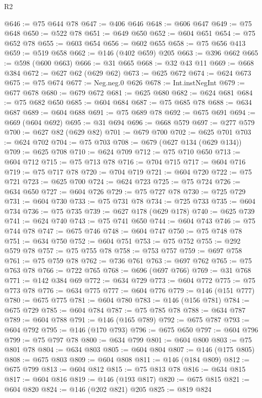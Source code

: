 \begin{lexlean}{R2}
\begin{coremodule}
@646 := @75 @644 @78
@647 := @406 @646
@648 := @606 @647
@649 := @75 @648
@650 := @522 @78
@651 := @649 @650
@652 := @604 @651
@654 := @75 @652 @78
@655 := @603 @654
@656 := @602 @655
@658 := @75 @656 @413
@659 := @519 @658
@662 := @146 (@402 @659) @205
@663 := @396 @662
@665 := @598 (@600 @663)
@666 := @31 @665
@668 := @32 @43 @11
@669 := @668 @384
@672 := @627 @62 (@629 @62)
@673 := @625 @672
@674 := @624 @673
@675 := @75 @674
@677 := Neg.neg.{0} @626
@678 := Int.instNegInt
@679 := @677 @678
@680 := @679 @672
@681 := @625 @680
@682 := @624 @681
@684 := @75 @682 @650
@685 := @604 @684
@687 := @75 @685 @78
@688 := @634 @687
@689 := @604 @688
@691 := @75 @689 @78
@692 := @675 @691
@694 := @669 (@604 @692)
@695 := @31 @694
@696 := @668 @579
@697 := @277 @579
@700 := @627 @82 (@629 @82)
@701 := @679 @700
@702 := @625 @701
@703 := @624 @702
@704 := @75 @703
@708 := @679 (@627 @134 (@629 @134))
@709 := @625 @708
@710 := @624 @709
@712 := @75 @710 @650
@713 := @604 @712
@715 := @75 @713 @78
@716 := @704 @715
@717 := @604 @716
@719 := @75 @717 @78
@720 := @704 @719
@721 := @604 @720
@722 := @75 @721
@723 := @625 @700
@724 := @624 @723
@725 := @75 @724
@726 := @634 @650
@727 := @604 @726
@729 := @75 @727 @78
@730 := @725 @729
@731 := @604 @730
@733 := @75 @731 @78
@734 := @725 @733
@735 := @604 @734
@736 := @75 @735
@739 := @627 @178 (@629 @178)
@740 := @625 @739
@741 := @624 @740
@743 := @75 @741 @650
@744 := @604 @743
@746 := @75 @744 @78
@747 := @675 @746
@748 := @604 @747
@750 := @75 @748 @78
@751 := @634 @750
@752 := @604 @751
@753 := @75 @752
@755 := @292 @579 @78
@757 := @75 @755 @78
@758 := @753 @757
@759 := @697 @758
@761 := @75 @759 @78
@762 := @736 @761
@763 := @697 @762
@765 := @75 @763 @78
@766 := @722 @765
@768 := @696 (@697 @766)
@769 := @31 @768
@771 := @142 @384 @69
@772 := @634 @729
@773 := @604 @772
@775 := @75 @773 @78
@776 := @634 @775
@777 := @604 @776
@779 := @146 (@151 @777)
@780 := @675 @775
@781 := @604 @780
@783 := @146 (@156 @781)
@784 := @675 @729
@785 := @604 @784
@787 := @75 @785 @78
@788 := @634 @787
@789 := @604 @788
@791 := @146 (@165 @789)
@792 := @675 @787
@793 := @604 @792
@795 := @146 (@170 @793)
@796 := @675 @650
@797 := @604 @796
@799 := @75 @797 @78
@800 := @634 @799
@801 := @604 @800
@803 := @75 @801 @78
@804 := @634 @803
@805 := @604 @804
@807 := @146 (@175 @805)
@808 := @675 @803
@809 := @604 @808
@811 := @146 (@184 @809)
@812 := @675 @799
@813 := @604 @812
@815 := @75 @813 @78
@816 := @634 @815
@817 := @604 @816
@819 := @146 (@193 @817)
@820 := @675 @815
@821 := @604 @820
@824 := @146 (@202 @821) @205
@825 := @819 @824

\end{coremodule}
\end{lexlean}
